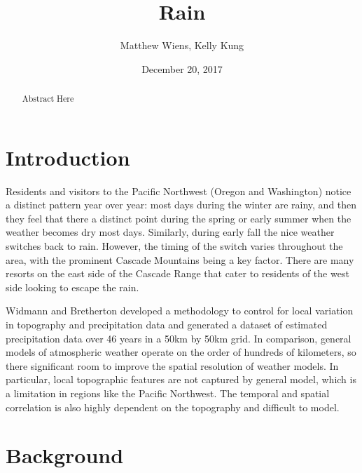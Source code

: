 \documentclass{article}
\begin{document}
\title{Rain}
\author{Matthew Wiens, Kelly Kung}
\date{December 20, 2017}
\maketitle
\begin{abstract}
Abstract Here
\end{abstract}

\section{Introduction}

Residents and visitors to the Pacific Northwest (Oregon and Washington) notice a distinct pattern year over year: most days during the winter are rainy, and then they feel that there a distinct point during the spring or early summer when the weather becomes dry most days. Similarly, during early fall the nice weather switches back to rain.  However, the timing of the switch varies throughout the area, with the prominent Cascade Mountains being a key factor. There are many resorts on the east side of the Cascade Range that cater to residents of the west side looking to escape the rain. 

Widmann and Bretherton developed a methodology to control for local variation in topography and precipitation data and generated a dataset of estimated precipitation data over 46 years in a 50km by 50km grid.  In comparison, general models of atmospheric weather operate on the order of hundreds of kilometers, so there significant room to improve the spatial resolution of weather models.  In particular, local topographic features are not captured by general model, which is a limitation in regions like the Pacific Northwest.
The temporal and spatial correlation is also highly dependent on the topography and difficult to model. 

\section{Background}
\end{document}
